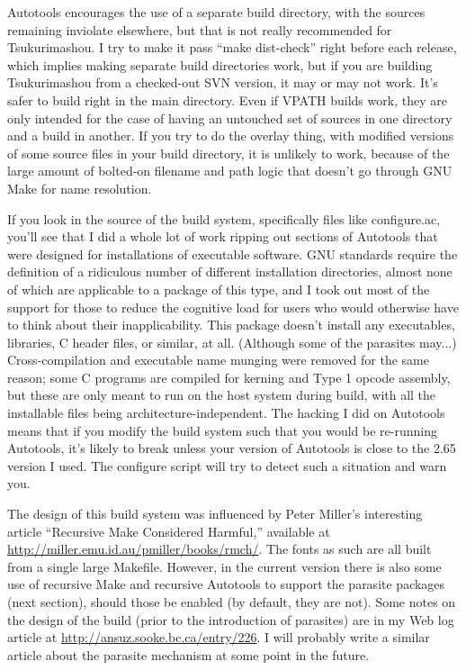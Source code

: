 \documentclass[14pt]{extarticle}
\begin{document}
Autotools encourages the use of a separate build directory, with the
sources remaining inviolate elsewhere, but that is not really
recommended for Tsukurimashou.  I try to make it pass ``make
dist-check'' right before each release, which implies making separate
build directories work, but if you are building Tsukurimashou from a
checked-out SVN version, it may or may not work.  It's safer
to build right in the main directory.  Even if VPATH builds work, they
are only intended for the case of having an untouched set of sources in
one directory and a build in another.  If you try to do the overlay
thing, with modified versions of some source files in your build
directory, it is unlikely to work, because of the large amount of
bolted-on filename and path logic that doesn't go through GNU Make for
name resolution.

If you look in the source of the build system, specifically files like
configure.ac, you'll see that I did a whole lot of work ripping out sections
of Autotools that were designed for installations of executable software. 
GNU standards require the definition of a ridiculous number of different
installation directories, almost none of which are applicable to a package
of this type, and I took out most of the support for those to reduce the
cognitive load for users who would otherwise have to think about their
inapplicability.  This package doesn't install any executables, libraries, C
header files, or similar, at all.  (Although some of the parasites may...)
Cross-compilation and executable name munging were removed for the same
reason; some C programs are compiled for kerning and Type 1 opcode assembly,
but these are only meant to run on the host system during build, with all
the installable files being architecture-independent.  The hacking I did on
Autotools means that if you modify the build system such that you would be
re-running Autotools, it's likely to break unless your version of Autotools
is close to the 2.65 version I used.  The configure script will try to
detect such a situation and warn you.

The design of this build system was influenced by Peter Miller's interesting
article ``Recursive Make Considered Harmful,'' available at
\url{http://miller.emu.id.au/pmiller/books/rmch/}.  The fonts as such are
all built from a single large Makefile.  However, in the current version
there is also some use of recursive Make and recursive Autotools to support
the parasite packages (next section), should those be enabled (by default,
they are not).  Some notes on the design of the build (prior to the
introduction of parasites) are in my Web log article at
\url{http://ansuz.sooke.bc.ca/entry/226}.  I will probably write a similar
article about the parasite mechanism at some point in the future.
\end{document}
